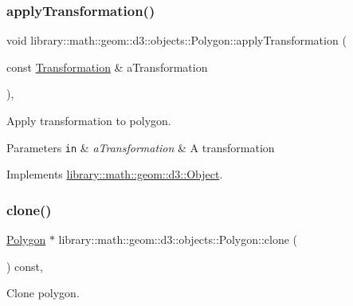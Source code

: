\subsubsection{\texorpdfstring{apply\+Transformation()}{applyTransformation()}}
{\footnotesize\ttfamily void library\+::math\+::geom\+::d3\+::objects\+::\+Polygon\+::apply\+Transformation (\begin{DoxyParamCaption}\item[{const \hyperlink{classlibrary_1_1math_1_1geom_1_1d3_1_1_transformation}{Transformation} \&}]{a\+Transformation }\end{DoxyParamCaption})\hspace{0.3cm}{\ttfamily [override]}, {\ttfamily [virtual]}}



Apply transformation to polygon. 


\begin{DoxyParams}[1]{Parameters}
\mbox{\tt in}  & {\em a\+Transformation} & A transformation \\
\hline
\end{DoxyParams}


Implements \hyperlink{classlibrary_1_1math_1_1geom_1_1d3_1_1_object_a5fc47b1ee5d9a28efc6010d3d1512470}{library\+::math\+::geom\+::d3\+::\+Object}.

\mbox{\label{classlibrary_1_1math_1_1geom_1_1d3_1_1objects_1_1_polygon_a54440dcce091424ecabdacc30892c2fc}} 
\subsubsection{\texorpdfstring{clone()}{clone()}}
{\footnotesize\ttfamily \hyperlink{classlibrary_1_1math_1_1geom_1_1d3_1_1objects_1_1_polygon}{Polygon} $\ast$ library\+::math\+::geom\+::d3\+::objects\+::\+Polygon\+::clone (\begin{DoxyParamCaption}{ }\end{DoxyParamCaption}) const\hspace{0.3cm}{\ttfamily [override]}, {\ttfamily [virtual]}}



Clone polygon. 

